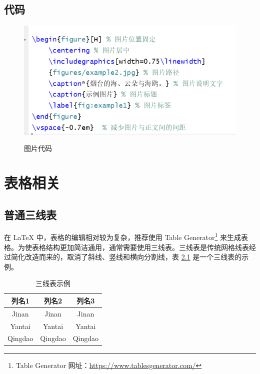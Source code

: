 \documentclass[
    report,     %
    oneside,    %
    UTF8,       %
    zihao=-4    %
]{config} %
\begin{document}
\section{代码}
\begin{figure}[H] %
    \centering %
    \includegraphics[width=0.75\linewidth]{image0.png} %
    \caption*{图片代码} %
    \caption{} %
    \label{fig:example1} %
\end{figure}
\vspace{-0.7em}  %



\chapter{表格相关}


\section{普通三线表}

在 \LaTeX{} 中，表格的编辑相对较为复杂，推荐使用 Table Generator\footnote{Table Generator 网址：\url{https://www.tablesgenerator.com/}} 来生成表格。为使表格结构更加简洁通用，通常需要使用三线表。三线表是传统网格线表经过简化改造而来的，取消了斜线、竖线和横向分割线，表 \ref{tab:three-line} 是一个三线表的示例。

\begin{table}[H] %
    \centering %
    \caption{三线表示例} %
    \label{tab:three-line} %
    \renewcommand\arraystretch{0.85} %
    \setlength{\tabcolsep}{12pt} %
    \begin{tabular}{ccc} %
        \toprule[1.5pt] %
        \textbf{列名1} & \textbf{列名2} & \textbf{列名3} \\ %
        \midrule[0.8pt] %
            Jinan & Jinan & Jinan \\ %
            Yantai & Yantai & Yantai \\ %
            Qingdao &  Qingdao &  Qingdao \\ %
        \bottomrule[1.5pt] %
    \end{tabular}
\end{table}
\vspace{-0.5em}  %
\end{document}
